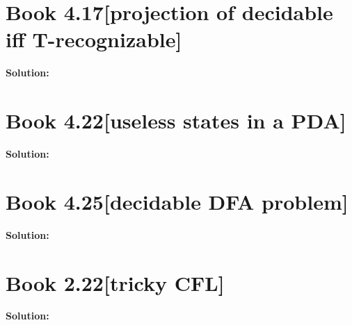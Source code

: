 \documentclass[11pt]{article}
\newenvironment{question}[2]
{\newpage\section{#1\texorpdfstring{\hfill}{horizontal spacing}{\rm\normalsize #2}}}{}
\newenvironment{solution}
{\textbf{Solution: }\color{blue}}
{\color{black}}
\begin{document}
\begin{question}{Book 4.17}{[projection of decidable iff T-recognizable]}



\begin{solution}



\end{solution}
\end{question}


\begin{question}{Book 4.22}{[useless states in a PDA]}



\begin{solution}



\end{solution}
\end{question}


\begin{question}{Book 4.25}{[decidable DFA problem]}



\begin{solution}



\end{solution}
\end{question}


\begin{question}{Book 2.22}{[tricky CFL]}



\begin{solution}



\end{solution}
\end{question}
\end{document}
